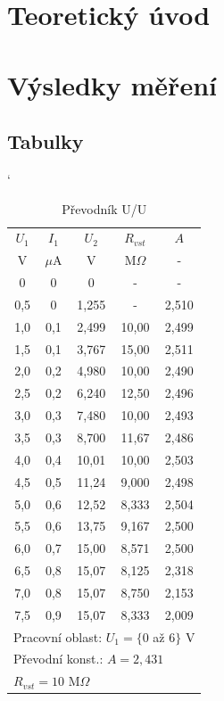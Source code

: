 \documentclass[a4paper, czech]{article}
\begin{document}
\section{Teoretický úvod}

\section{Výsledky měření}

\subsection{Tabulky}

\begin{minipage}{0.48\textwidth}
    \begin{table}[H]
        \catcode`
        \centering
        \caption{Převodník U/U}
        \begin{tabular}{ccccc}
            \toprule
            $U_1$  & $I_1$  & $U_2$    & $R_{vst}$  & $A$     \\
            \cmidrule(rl){1-1}
            \cmidrule(rl){2-2}
            \cmidrule(rl){3-3}
            \cmidrule(rl){4-4}
            \cmidrule(rl){5-5}
            V   & $\mu$A  & V     & M$\Omega$    & -     \\
            \midrule
            0   & 0   & 0     & -     & -     \\
            0,5 & 0   & 1,255 & -     & 2,510 \\
            1,0 & 0,1 & 2,499 & 10,00 & 2,499 \\
            1,5 & 0,1 & 3,767 & 15,00 & 2,511 \\
            2,0 & 0,2 & 4,980 & 10,00 & 2,490 \\
            2,5 & 0,2 & 6,240 & 12,50 & 2,496 \\
            3,0 & 0,3 & 7,480 & 10,00 & 2,493 \\
            3,5 & 0,3 & 8,700 & 11,67 & 2,486 \\
            4,0 & 0,4 & 10,01 & 10,00 & 2,503 \\
            4,5 & 0,5 & 11,24 & 9,000 & 2,498 \\
            5,0 & 0,6 & 12,52 & 8,333 & 2,504 \\
            5,5 & 0,6 & 13,75 & 9,167 & 2,500 \\
            6,0 & 0,7 & 15,00 & 8,571 & 2,500 \\
            6,5 & 0,8 & 15,07 & 8,125 & 2,318 \\
            7,0 & 0,8 & 15,07 & 8,750 & 2,153 \\
            7,5 & 0,9 & 15,07 & 8,333 & 2,009 \\
            \bottomrule
            \multicolumn{5}{l}{Pracovní oblast: $U_1 = \{0$ až $6\}$ V} \\
            \multicolumn{5}{l}{Převodní konst.: $A = 2,431$} \\
            \multicolumn{5}{l}{$R_{vst} = 10$ M$\Omega$} \\
        \end{tabular}
    \end{table}
\end{minipage}
\end{document}
